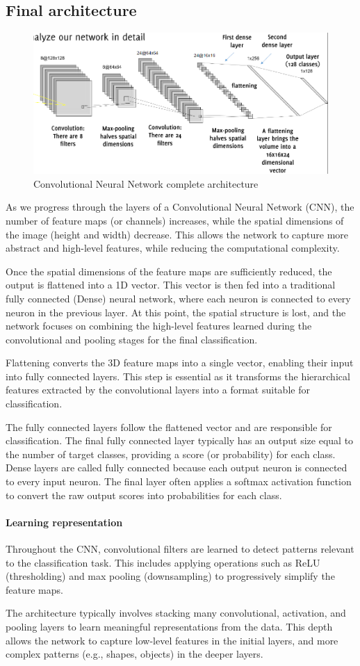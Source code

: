 \subsection{Final architecture}
\begin{figure}[H]
    \centering
    \includegraphics[width=0.5\linewidth]{images/cnn1.png}
    \caption{Convolutional Neural Network complete architecture}
\end{figure}
As we progress through the layers of a Convolutional Neural Network (CNN), the number of feature maps (or channels) increases, while the spatial dimensions of the image (height and width) decrease. 
This allows the network to capture more abstract and high-level features, while reducing the computational complexity.

Once the spatial dimensions of the feature maps are sufficiently reduced, the output is flattened into a 1D vector. 
This vector is then fed into a traditional fully connected (Dense) neural network, where each neuron is connected to every neuron in the previous layer. 
At this point, the spatial structure is lost, and the network focuses on combining the high-level features learned during the convolutional and pooling stages for the final classification.

Flattening converts the 3D feature maps into a single vector, enabling their input into fully connected layers.
This step is essential as it transforms the hierarchical features extracted by the convolutional layers into a format suitable for classification.

The fully connected layers follow the flattened vector and are responsible for classification. 
The final fully connected layer typically has an output size equal to the number of target classes, providing a score (or probability) for each class.
Dense layers are called fully connected because each output neuron is connected to every input neuron.
The final layer often applies a softmax activation function to convert the raw output scores into probabilities for each class.

\paragraph*{Learning representation}
Throughout the CNN, convolutional filters are learned to detect patterns relevant to the classification task. 
This includes applying operations such as ReLU (thresholding) and max pooling (downsampling) to progressively simplify the feature maps.

The architecture typically involves stacking many convolutional, activation, and pooling layers to learn meaningful representations from the data. 
This depth allows the network to capture low-level features in the initial layers, and more complex patterns (e.g., shapes, objects) in the deeper layers.